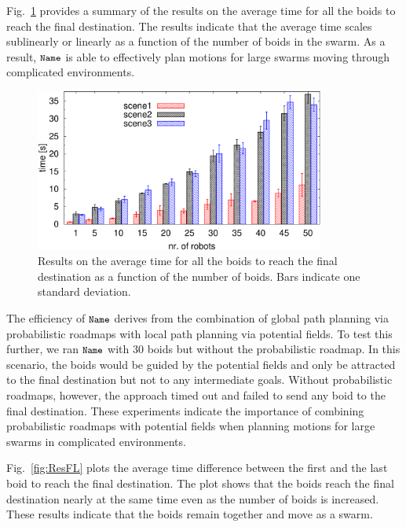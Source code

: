 \documentclass{llncs}
\newcommand{\Acronym}[1]{\ensuremath{{\small{\texttt{#1}}}}}
\newcommand{\Name}{\Acronym{Name}}
\begin{document}
Fig.~\ref{fig:ResT} provides a summary of the results on the average
time for all the boids to reach the final destination. The results
indicate that the average time scales sublinearly or linearly as a
function of the number of boids in the swarm. As a result, $\Name$ is
able to effectively plan motions for large swarms moving through
complicated environments.


\begin{figure}
\centering
\includegraphics[width=0.85\textwidth]{figResT}
\caption{Results on the average time for all the boids to reach the
  final destination as a function of the number of boids. Bars
  indicate one standard deviation.}
\label{fig:ResT}
\end{figure}

\noindent
The efficiency of $\Name$ derives from the combination of global path
planning via probabilistic roadmaps with local path planning via
potential fields.  To test this further, we ran $\Name$ with 30 boids
but without the
probabilistic roadmap. In this scenario, the boids would be guided by
the potential fields and only be attracted to the final destination
but not to any intermediate goals. Without probabilistic roadmaps,
however, the approach timed out and failed to send any boid to the
final destination. These experiments indicate the importance of
combining probabilistic roadmaps with potential fields when planning
motions for large swarms in complicated environments.


Fig.~\ref{fig:ResFL} plots the average time difference between the
first and the last boid to reach the final destination. The plot
shows that the boids reach the final destination nearly at the same
time even as the number of boids is increased. These results indicate
that the boids remain together and move as a swarm.  
\end{document}
